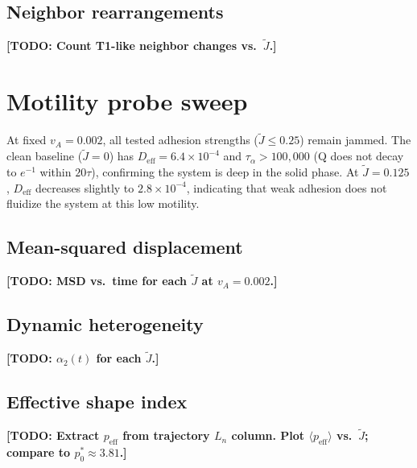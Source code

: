 \documentclass[aps,pre,twocolumn,superscriptaddress,longbibliography,floatfix]{revtex4-2}
\newcommand{\vA}{v_{\!A}}                  %
\newcommand{\peff}{p_{\mathrm{eff}}}       %
\newcommand{\Jt}{\tilde{J}}               %
\newcommand{\TODO}[1]{{\color{red}\textbf{[TODO: #1]}}}
\begin{document}
\subsection{Neighbor rearrangements}
\label{sec:quench:topology}

\TODO{Count T1-like neighbor changes vs.\ $\Jt$.}


\section{Motility probe sweep}
\label{sec:motility}

At fixed $\vA = 0.002$, all tested adhesion strengths
($\Jt \leq 0.25$) remain jammed. The clean baseline
($\Jt = 0$) has $D_{\mathrm{eff}} = 6.4 \times 10^{-4}$
and $\tau_\alpha > 100{,}000$ (Q does not decay to $e^{-1}$
within $20\tau$), confirming the system is deep in the solid
phase. At $\Jt = 0.125$, $D_{\mathrm{eff}}$ decreases
slightly to $2.8 \times 10^{-4}$, indicating that weak
adhesion does not fluidize the system at this low motility.

\subsection{Mean-squared displacement}
\label{sec:motility:msd}

\TODO{MSD vs.\ time for each $\Jt$ at $\vA = 0.002$.}

\subsection{Dynamic heterogeneity}
\label{sec:motility:alpha2}

\TODO{$\alpha_2(t)$ for each $\Jt$.}

\subsection{Effective shape index}
\label{sec:motility:shape}

\TODO{Extract $\peff$ from trajectory $L_n$ column. Plot
$\langle\peff\rangle$ vs.\ $\Jt$; compare to
$p_0^* \approx 3.81$.}


\end{document}
